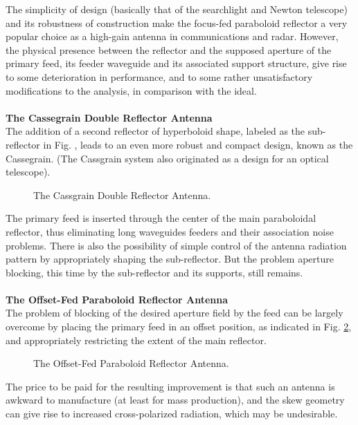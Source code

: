 The simplicity of design (basically that of the searchlight and Newton telescope) and its robustness of construction make the focus-fed paraboloid reflector a very popular choice as a high-gain antenna in communications and radar. However, the physical presence between the reflector and the supposed aperture of the primary feed, its feeder waveguide and its associated support structure, give rise to some deterioration in performance, and to some rather unsatisfactory modifications to the analysis, in comparison with the ideal.\\
\\
\textbf{The Cassegrain Double Reflector Antenna}\\
The addition of a second reflector of hyperboloid shape, labeled as the sub-reflector in Fig. , leads to an even more robust and compact design, known as the Cassegrain. (The Cassgrain system also originated as a design for an optical telescope).
\begin{figure}[htbp]
	\begin{center}
	\end{center}
	\caption{The Cassgrain Double Reflector Antenna.}
	\label{fig:cassegrain}
\end{figure}
The primary feed is inserted through the center of the main paraboloidal reflector, thus eliminating long waveguides feeders and their association noise problems. There is also the possibility of simple control of the antenna radiation pattern by appropriately shaping the sub-reflector. But the problem aperture blocking, this time by the sub-reflector and its supports, still remains.\\
\\
\textbf{The Offset-Fed Paraboloid Reflector Antenna}\\
The problem of blocking of the desired aperture field by the feed can be largely overcome by placing the primary feed in an offset position, as indicated in Fig. \ref{fig:offset-feed}, and appropriately restricting the extent of the main reflector. 
\begin{figure}[htbp]
	\begin{center}
	\end{center}
	\caption{The Offset-Fed Paraboloid Reflector Antenna.}
	\label{fig:offset-feed}
\end{figure}
The price to be paid for the resulting improvement is that such an antenna is awkward to manufacture (at least for mass production), and the skew geometry can give rise to increased cross-polarized radiation, which may be undesirable.

